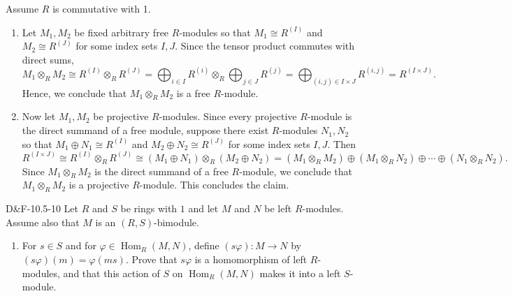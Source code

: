 \documentclass{article}
\begin{document}
	Assume $R$ is commutative with 1. \vspace{-0.25cm}
	\begin{enumerate}[itemsep =-2pt,label = (\alph{*})]
		\item Let $M_{1}, M_{2}$ be fixed arbitrary free $R$-modules so that $M_{1} \cong R^{(I)}$ and $M_{2} \cong R^{(J)}$ for some index sets $I, J$. Since the tensor product commutes with direct sums, 
		\begin{equation*}
			M_{1} \otimes_{R} M_{2} \cong R^{(I)} \otimes_{R} R^{(J)} = \bigoplus_{i\in I}R^{(i)} \otimes_{R} \bigoplus_{j \in J}R^{(j)} = \bigoplus_{(i,j) \in I \times J}R^{(i,j)} = R^{(I \times J)}. 
		\end{equation*}
		Hence, we conclude that $M_{1} \otimes_{R} M_{2}$ is a free $R$-module. 
		\item Now let $M_{1}, M_{2}$ be projective $R$-modules. Since every projective $R$-module is the direct summand of a free module, suppose there exist $R$-modules $N_{1}, N_{2}$ so that $M_{1} \oplus N_{1} \cong R^{(I)}$ and $M_{2} \oplus N_{2} \cong R^{(J)}$ for some index sets $I, J$. Then 
		\begin{equation*}
			R^{(I \times J)} \cong R^{(I)}\otimes_{R} R^{(J)} \cong (M_{1} \oplus N_{1}) \otimes_{R} (M_{2} \oplus N_{2}) = (M_{1} \otimes_{R} M_{2}) \oplus (M_{1} \otimes_{R}N_{2}) \oplus \dotsm \oplus (N_{1} \otimes_{R} N_{2}). 
		\end{equation*}
		Since $M_{1} \otimes_{R} M_{2}$ is the direct summand of a free $R$-module, we conclude that $M_{1} \otimes_{R} M_{2}$ is a projective $R$-module. This concludes the claim. 
	\end{enumerate}
	
	\begin{prb}{D\&F-10.5-10}
		Let $R$ and $S$ be rings with $1$ and let $M$ and $N$ be left $R$-modules. Assume also that $M$ is an $(R,S)$-bimodule. \vspace{-0.25cm}
		\begin{enumerate}[itemsep =-2pt,label = \textbf{(\alph{*})}]
			\item For $s \in S$ and for $\varphi \in \operatorname{Hom}_{R}(M, N)$, define $(s\varphi): M \to N$ by $(s\varphi)(m) = \varphi(ms)$. Prove that $s\varphi$ is a homomorphism of left $R$-modules, and that this action of $S$ on $\operatorname{Hom}_{R}(M, N)$ makes it into a left $S$-module. 
		\end{enumerate}
	\end{prb}
	
\end{document}
